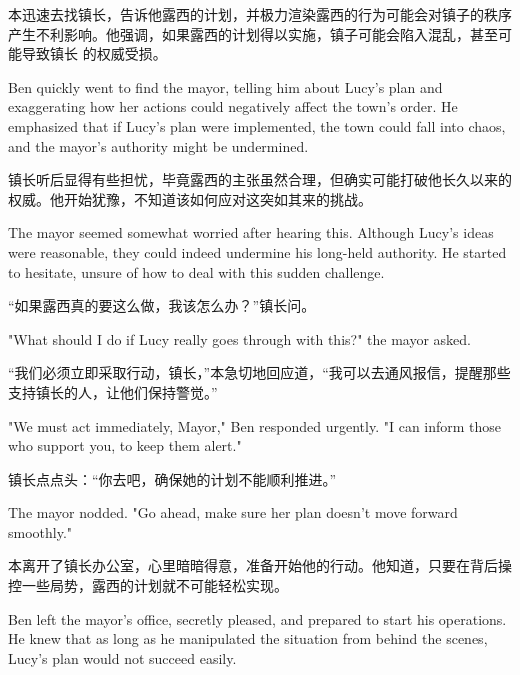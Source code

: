 本迅速去找镇长，告诉他露西的计划，并极力渲染露西的行为可能会对镇子的秩序产生不利影响。他强调，如果露西的计划得以实施，镇子可能会陷入混乱，甚至可能导致镇长
的权威受损。

\begin{flushright} Ben quickly went to find the mayor, telling him about Lucy’s
    plan and exaggerating how her actions could negatively affect the town's
    order.
    He emphasized that if Lucy’s plan were implemented, the town could fall
    into
    chaos, and the mayor’s authority might be undermined. \end{flushright}

镇长听后显得有些担忧，毕竟露西的主张虽然合理，但确实可能打破他长久以来的权威。他开始犹豫，不知道该如何应对这突如其来的挑战。

\begin{flushright} The mayor seemed somewhat worried after hearing this.
    Although Lucy’s ideas were reasonable, they could indeed undermine his
    long-held authority. He started to hesitate, unsure of how to deal with
    this
    sudden challenge. \end{flushright}

“如果露西真的要这么做，我该怎么办？”镇长问。

\begin{flushright} "What should I do if Lucy really goes through with this?"
    the mayor asked. \end{flushright}

“我们必须立即采取行动，镇长，”本急切地回应道，“我可以去通风报信，提醒那些支持镇长的人，让他们保持警觉。”

\begin{flushright} "We must act immediately, Mayor," Ben responded urgently. "I
    can inform those who support you, to keep them alert." \end{flushright}

镇长点点头：“你去吧，确保她的计划不能顺利推进。”

\begin{flushright} The mayor nodded. "Go ahead, make sure her plan doesn’t move
    forward smoothly." \end{flushright}

本离开了镇长办公室，心里暗暗得意，准备开始他的行动。他知道，只要在背后操控一些局势，露西的计划就不可能轻松实现。

\begin{flushright} Ben left the mayor's office, secretly pleased, and prepared
    to start his operations. He knew that as long as he manipulated the
    situation
    from behind the scenes, Lucy’s plan would not succeed easily.
\end{flushright}

